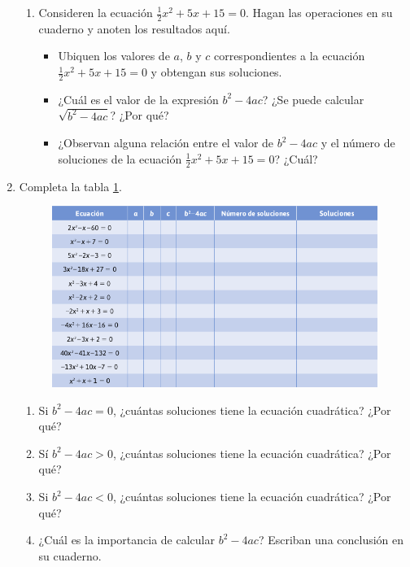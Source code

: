 \documentclass[11pt]{book}
\begin{document}
\begin{enumerate}
\begin{enumerate}
          \item Consideren la ecuación $\frac{1}{2}x^2 + 5x + 15 = 0$. Hagan las operaciones en su cuaderno y anoten los resultados aquí.
                \begin{itemize}
                  \item Ubiquen los valores de $a$, $b$ y $c$ correspondientes a la ecuación $\frac{1}{2}x^2 + 5x + 15 = 0$ y obtengan sus soluciones.
                  \item ¿Cuál es el valor de la expresión $b^2 - 4ac$? ¿Se puede calcular $\sqrt{b^2 - 4ac}$? ¿Por qué?
                  \item ¿Observan alguna relación entre el valor de $b^2 - 4ac$ y el número de soluciones de la ecuación $\frac{1}{2}x^2 + 5x + 15 = 0$? ¿Cuál?
                \end{itemize}
        \end{enumerate}

  \item Completa la tabla \ref{tab:table2.11}.

        \begin{figure}[H]
          \centering
          \includegraphics[width=\textwidth]{table2.11.png}
          \label{tab:table2.11}
        \end{figure}

        \begin{enumerate}
          \item Si $b^2 - 4ac = 0$, ¿cuántas soluciones tiene la ecuación cuadrática? ¿Por qué?
          \item Sí $b^2 - 4ac > 0$, ¿cuántas soluciones tiene la ecuación cuadrática? ¿Por qué?
          \item Si $b^2 - 4ac < 0$, ¿cuántas soluciones tiene la ecuación cuadrática? ¿Por qué?
          \item ¿Cuál es la importancia de calcular $b^2 - 4ac$? Escriban una conclusión en su cuaderno.
        \end{enumerate}


\end{enumerate}
\end{document}

